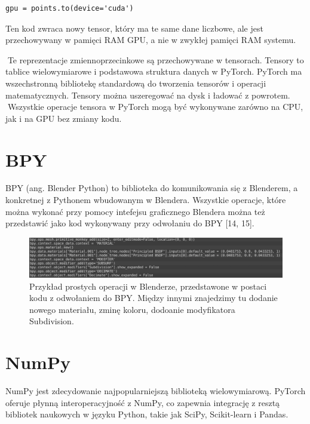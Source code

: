 \documentclass[brudnopis]{xmgr}
\begin{document}
\begin{lstlisting}
gpu = points.to(device='cuda')
\end{lstlisting}


Ten kod zwraca nowy tensor, który ma te same dane liczbowe, ale jest przechowywany w pamięci RAM GPU, a nie w zwykłej pamięci RAM systemu.

􏰹Te reprezentacje zmiennoprzecinkowe są przechowywane w tensorach. Tensory to tablice wielowymiarowe i podstawowa struktura danych w PyTorch. PyTorch ma wszechstronną bibliotekę standardową do tworzenia tensorów i operacji matematycznych. Tensory można uszeregować na dysk i ładować z powrotem.
􏰹Wszystkie operacje tensora w PyTorch mogą być wykonywane zarówno na CPU, jak i na GPU bez zmiany kodu.

  \section{BPY\label{s:dsssl}}
  
  BPY (ang. Blender Python) to biblioteka do komunikowania się z Blenderem, a konkretnej z Pythonem wbudowanym w Blendera. Wszystkie operacje, które można wykonać przy pomocy intefejsu graficznego Blendera można też przedstawić jako kod wykonywany przy odwołaniu do BPY [14, 15].
  
  
  \begin{figure}[!tbh]
\centering
\includegraphics[width=1.1\hsize]{fig/8}
\caption{Przykład prostych operacji w Blenderze, przedstawone w postaci kodu z odwołaniem do BPY. Między innymi znajedzimy tu dodanie nowego materiału, zminę koloru, dodoanie modyfikatora Subdivision.\label{RYS.3}}
\end{figure}
  
    \section{NumPy\label{s:dsssl}}
    
    NumPy jest zdecydowanie najpopularniejszą biblioteką wielowymiarową. PyTorch oferuje płynną interoperacyjność z NumPy, co zapewnia integrację z resztą bibliotek naukowych w języku Python, takie jak SciPy, Scikit-learn i Pandas.
    
\end{document}
